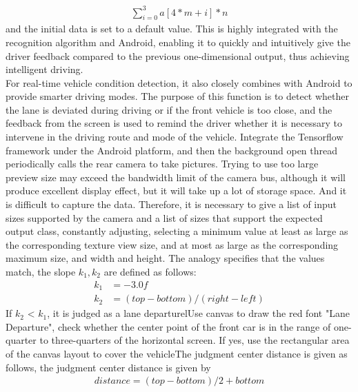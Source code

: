 \documentclass[12pt, a4paper]{article}
\begin{document}
\begin{align}
  \sum_{i=0}^{3}a[4 \ast m + i] \ast n
\end{align}
and the initial data is set to a default value. This is highly integrated with the recognition algorithm and Android, enabling it to quickly and intuitively give the driver feedback compared to the previous one-dimensional output, thus achieving intelligent driving.
\\For real-time vehicle condition detection, it also closely combines with Android to provide smarter driving modes. The purpose of this function is to detect whether the lane is deviated during driving or if the front vehicle is too close, and the feedback from the screen is used to remind the driver whether it is necessary to intervene in the driving route and mode of the vehicle. Integrate the Tensorflow framework under the Android platform, and then the background open thread periodically calls the rear camera to take pictures. Trying to use too large preview size may exceed the bandwidth limit of the camera bus, although it will produce excellent display effect, but it will take up a lot of storage space. And it is difficult to capture the data. Therefore, it is necessary to give a list of input sizes supported by the camera and a list of sizes that support the expected output class, constantly adjusting, selecting a minimum value at least as large as the corresponding texture view size, and at most as large as the corresponding maximum size, and width and height. The analogy specifies that the values ​​match, the slope $k_1,k_2$ are defined as follows:
\begin{align}
  k_1 &= -3.0f\\
  k_2 &= (top - bottom) / (right - left)
\end{align}
If $k_2$ < $k_1$, it is judged as a lane departurelUse canvas to draw the red font "Lane Departure", check whether the center point of the front car is in the range of one-quarter to three-quarters of the horizontal screen. If yes, use the rectangular area of the canvas layout to cover the vehicleThe judgment center distance is given as follows, the judgment center distance is given by
\begin{align}
  distance = (top - bottom) / 2 + bottom
\end{align}
\end{document}
